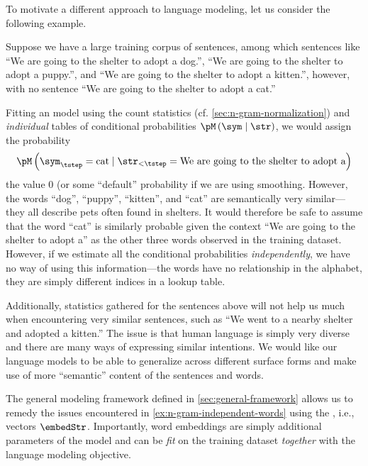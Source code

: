 To motivate a different approach to language modeling, let us consider the following example.
\begin{example} \label{ex:n-gram-independent-words}
    Suppose we have a large training corpus of sentences, among which sentences like ``We are going to the shelter to adopt a dog.'', ``We are going to the shelter to adopt a puppy.'', and ``We are going to the shelter to adopt a kitten.'', however, with no sentence ``We are going to the shelter to adopt a cat.''
    
    Fitting an \ngram{} model using the count statistics (cf. \cref{sec:n-gram-normalization}) and \emph{individual} tables of conditional probabilities $\pM\left(\sym\mid\str\right)$, we would assign the probability $$\pM\left(\sym_\tstep = \text{cat}\mid\str_{< \tstep} = \text{We are going to the shelter to adopt a}\right)$$ the value $0$ (or some ``default'' probability if we are using smoothing.
    However, the words ``dog'', ``puppy'', ``kitten'', and ``cat'' are semantically very similar---they all describe pets often found in shelters.
    It would therefore be safe to assume that the word ``cat'' is similarly probable given the context ``We are going to the shelter to adopt a'' as the other three words observed in the training dataset.
    However, if we estimate all the conditional probabilities \emph{independently}, we have no way of using this information---the words have no relationship in the alphabet, they are simply different indices in a lookup table.

    Additionally, statistics gathered for the sentences above will not help us much when encountering very similar sentences, such as ``We went to a nearby shelter and adopted a kitten.''
    The issue is that human language is simply very diverse and there are many ways of expressing similar intentions.
    We would like our language models to be able to generalize across different surface forms and make use of more ``semantic'' content of the sentences and words.
\end{example}

The general modeling framework defined in \cref{sec:general-framework} allows us to remedy the issues encountered in \cref{ex:n-gram-independent-words} using the , i.e., vectors $\embedStr$.
Importantly, word embeddings are simply additional parameters of the model and can be \emph{fit} on the training dataset \emph{together} with the language modeling objective. 

